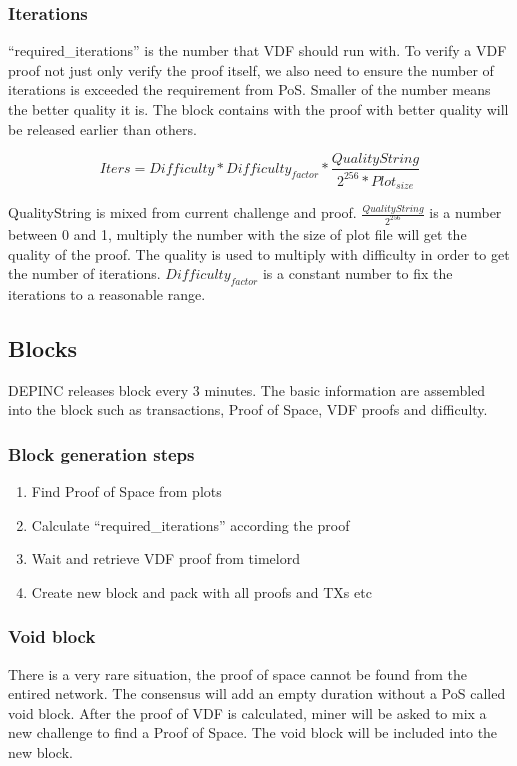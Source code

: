 \subsubsection{Iterations}
\begin{flushleft}
    ``required\_iterations'' is the number that VDF should run with. To verify a VDF proof not just only verify the proof itself, we also need to ensure the number of iterations is exceeded the requirement from PoS. Smaller of the number means the better quality it is. The block contains with the proof with better quality will be released earlier than others.
\end{flushleft}
\begin{equation}
    Iters = Difficulty * Difficulty_{factor} * \frac{QualityString}{2^{256} * Plot_{size}}
\end{equation}
\begin{flushleft}
    QualityString is mixed from current challenge and proof. $\frac{QualityString}{2^{256}}$ is a number between 0 and 1, multiply the number with the size of plot file will get the quality of the proof. The quality is used to multiply with difficulty in order to get the number of iterations. $Difficulty_{factor}$ is a constant number to fix the iterations to a reasonable range.
\end{flushleft}
\subsection{Blocks}
\begin{flushleft}
    DEPINC releases block every 3 minutes. The basic information are assembled into the block such as transactions, Proof of Space, VDF proofs and difficulty.
\end{flushleft}
\subsubsection{Block generation steps}
\begin{enumerate}
    \item Find Proof of Space from plots
    \item Calculate ``required\_iterations'' according the proof
    \item Wait and retrieve VDF proof from timelord
    \item Create new block and pack with all proofs and TXs etc
\end{enumerate}

\subsubsection{Void block}
\begin{flushleft}
    There is a very rare situation, the proof of space cannot be found from the entired network. The consensus will add an empty duration without a PoS called void block. After the proof of VDF is calculated, miner will be asked to mix a new challenge to find a Proof of Space. The void block will be included into the new block.
\end{flushleft}
